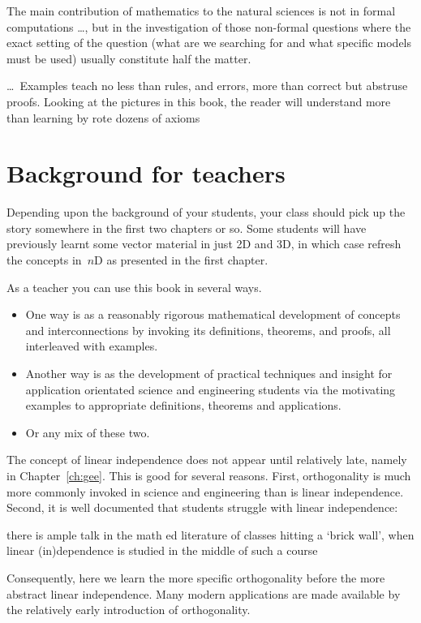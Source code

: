 \begin{quoted}{\cite[p.xiii]{Arnold2014}}
The main contribution of mathematics to the natural sciences is not in formal computations \ldots, but in the investigation of those non-formal questions where the exact setting of the question (what are we searching for and what specific models must be used) usually constitute half the matter.

\ldots\
Examples teach no less than rules, and errors, more than correct but abstruse proofs.  
Looking at the pictures in this book, the reader will understand more than learning by rote dozens of axioms
\end{quoted}








\section*{Background for teachers}

Depending upon the background of your students, your class should pick up the story somewhere in the first two chapters or so.
Some students will have previously learnt some vector material in just 2D and 3D,  in which case refresh the concepts in~\(n\)D as presented in the first chapter.

As a teacher you can use this book in several ways.
\begin{itemize}
\item One way is as a reasonably rigorous mathematical development of concepts and interconnections by invoking its definitions, theorems, and proofs, all interleaved with examples.
\item Another way is as the development of practical techniques and insight for application orientated science and engineering students via the motivating examples to appropriate definitions, theorems and applications. 
\item Or any mix of these two.
\end{itemize}

The concept of linear independence does not appear until relatively late, namely in Chapter~\ref{ch:gee}.
This is good for several reasons.
First, orthogonality is much more commonly invoked in science and engineering than is linear independence.
Second, it is well documented that students struggle with linear independence:
\begin{quoted}{\cite{Uhlig02}}
there is ample talk in the math ed literature of classes hitting a `brick wall', when linear (in)dependence is studied in the middle of such a course
\end{quoted}
Consequently, here we learn the more specific orthogonality before the more abstract linear independence.
Many modern applications are made available by the relatively early introduction of orthogonality.

